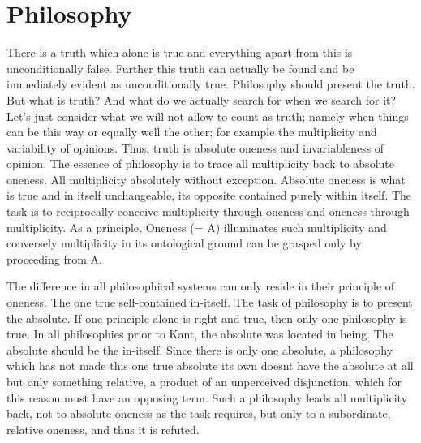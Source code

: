 \documentclass{article}
\begin{document}
\part {Philosophy}
There is a truth which alone is true
and everything apart from this is unconditionally false.
Further this truth can actually be found
and be immediately evident as unconditionally true.
Philosophy should present the truth.
But what is truth?
And what do we actually search for when we search for it?
Let's just consider what we will not allow to count as truth;
namely when things can be this way or equally well the other;
for example the multiplicity and variability of opinions.
Thus, truth is absolute oneness and invariableness of opinion.
The essence of philosophy is to trace all multiplicity back to absolute oneness.
All multiplicity absolutely without exception.
Absolute oneness is what is true and in itself unchangeable,
its opposite contained purely within itself.
The task is to reciprocally conceive
multiplicity through oneness and oneness through multiplicity.
As a principle, Oneness (= A) illuminates such multiplicity
and conversely multiplicity in its ontological ground
can be grasped only by proceeding from A.

The difference in all philosophical systems
can only reside in their principle of oneness.
The one true self-contained in-itself.
The task of philosophy is to present the absolute.
If one principle alone is right and true,
then only one philosophy is true.
In all philosophies prior to Kant,
the absolute was located in being.
The absolute should be the in-itself.
Since there is only one absolute,
a philosophy which has not made this one true absolute its own
doesnt have the absolute at all but only something relative,
a product of an unperceived disjunction,
which for this reason must have an opposing term.
Such a philosophy leads all multiplicity back,
not to absolute oneness as the task requires,
but only to a subordinate, relative oneness,
and thus it is refuted.
\end{document}
